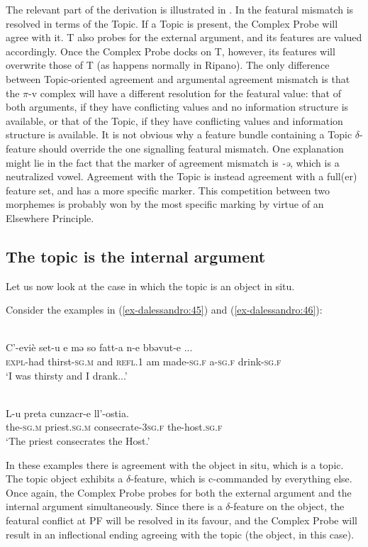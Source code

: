 \documentclass[output=paper
,modfonts
,nonflat]{langsci/langscibook}
\begin{document}
The relevant part of the derivation is illustrated in . In  the featural mismatch is resolved in terms of the Topic. If a Topic is present, the Complex Probe will agree with it. T also probes for the external argument, and its features are valued accordingly. Once the Complex Probe docks on T, however, its features will overwrite those of T (as happens normally in Ripano). The only difference between Topic-oriented agreement and argumental agreement mismatch is that the $\pi $-v complex will have a different resolution for the featural value: that of both arguments, if they have conflicting values and no information structure is available, or that of the Topic, if they have conflicting values and information structure is available.  
It is not obvious why a feature bundle containing a Topic $\delta $-feature should override the one signalling featural mismatch. One explanation might lie in the fact that the marker of agreement mismatch is \textit{{}-ə}, which is a neutralized vowel. Agreement with the Topic is instead agreement with a full(er) feature set, and has a more specific marker. This competition between two morphemes is probably won by the most specific marking by virtue of an Elsewhere Principle. 

\subsection{The topic is the internal argument}\label{sec-dalessandro:5.2}
Let us now look at the case in which the topic is an object in situ. 

Consider the examples in (\ref{ex-dalessandro:45}) and (\ref{ex-dalessandro:46}):

\begin{exe}
	\ex \label{ex-dalessandro:45}\citet[59]{Rossi2008}\\
	\gll C’-eviè   set-u     e   mə   so   fatt-a     n-e   bbəvut-e ...\\
	\textsc{expl-}had  thirst-\textsc{sg.m} and  \textsc{refl.1} am  made-\textsc{sg.f} a-\textsc{sg.f} drink-\textsc{sg.f}\\
	\glt `I was thirsty and I drank...'
\end{exe}
\begin{exe}
	\ex\label{ex-dalessandro:46}\citet[87]{Rossi2008}\\
	\gll L-u   preta     cunzacr-e     ll’-ostia.\\
	the-\textsc{sg.m} priest.\textsc{sg.m} consecrate-\textsc{3sg.f} the-host.\textsc{sg.f}\\
	\glt `The priest consecrates the Host.'
\end{exe}
In these examples there is agreement with the object in situ, which is a topic. The topic object exhibits a $\delta $-feature, which is c-commanded by everything else. Once again, the Complex Probe probes for both the external argument and the internal argument simultaneously. Since there is a $\delta $-feature on the object, the featural conflict at PF will be resolved in its favour, and the Complex Probe will result in an inflectional ending agreeing with the topic (the object, in this case).
\end{document}
